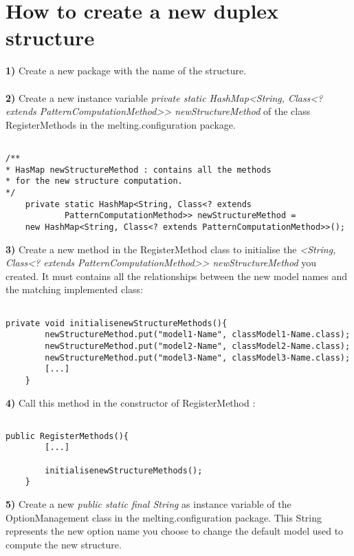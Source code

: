 \documentclass{article}
\begin{document}
\section{How to create a new duplex structure}

\textbf{1)} Create a new package with the name of the structure. \\
\\

\textbf{2)} Create a new instance variable 
\textit{private static HashMap<String, Class<? extends PatternComputationMethod>> newStructureMethod}
of the class RegisterMethods in the melting.configuration package.

\begin{verbatim}

/**
* HasMap newStructureMethod : contains all the methods 
* for the new structure computation.
*/
	private static HashMap<String, Class<? extends 
	        PatternComputationMethod>> newStructureMethod = 
	new HashMap<String, Class<? extends PatternComputationMethod>>();

\end{verbatim}


\textbf{3)} Create a new method in the RegisterMethod class to initialise the 
\textit{<String, Class<? extends PatternComputationMethod>> newStructureMethod} you created. It must contains
all the relationships between the new model names and the matching implemented class:

\begin{verbatim}

private void initialisenewStructureMethods(){
		newStructureMethod.put("model1-Name", classModel1-Name.class);
		newStructureMethod.put("model2-Name", classModel2-Name.class);
		newStructureMethod.put("model3-Name", classModel3-Name.class);
		[...]
	}

\end{verbatim}


\textbf{4)} Call this method in the constructor of RegisterMethod :

\begin{verbatim}

public RegisterMethods(){
		[...]
		
		initialisenewStructureMethods();
	}

\end{verbatim}


\textbf{5)} Create a new \textit{public static final String} as instance variable of the OptionManagement
class in the melting.configuration package. This String represents the new option name you choose
to change the default model used to compute the new structure.
\end{document}
